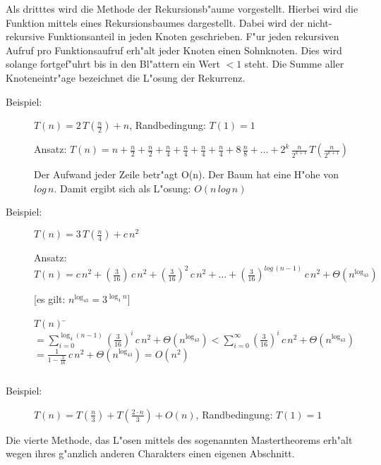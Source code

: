 \documentclass[draft,12pt]{scrreprt}
\theoremstyle{break}
\begin{document}
Als dritttes wird die Methode der Rekursionsb"aume vorgestellt.
Hierbei wird die Funktion mittels eines Rekursionsbaumes dargestellt. Dabei wird der nicht-rekursive Funktionsanteil in jeden Knoten
geschrieben. F"ur jeden rekursiven Aufruf pro Funktionsaufruf erh"alt jeder Knoten einen Sohnknoten. Dies wird solange fortgef"uhrt bis
in den Bl"attern ein Wert $< 1$ steht. Die Summe aller Knoteneintr"age bezeichnet die L"osung der Rekurrenz.
	\begin{description}
		\item [Beispiel:] $T(n) = 2\, T\left(\frac{n}{2}\right) + n$, Randbedingung: $T(1)=1$
			
		Ansatz: $T(n) = n + \frac{n}{2} + \frac{n}{2} + \frac{n}{4} + \frac{n}{4} + \frac{n}{4} + \frac{n}{4} + 8\, \frac{n}{8} + 
		\ldots + {2^k} \, \frac{n}{2^{k+1}}\, T\left(\frac{n}{2^{k+1}}\right)$
			
		
			
		Der Aufwand jeder Zeile betr"agt O(n). Der Baum hat eine H"ohe von $log\,n$. Damit ergibt sich als L"osung: 
		$O(n\, log\,n)$			
		
		\item [Beispiel:] $T(n) = 3\, T(\frac{n}{4}) + c\, n^2$
						
		Ansatz: $T(n) = c\, n^2 + \left(\frac{3}{16} \right) \, c\, n^2 + \left(\frac{3}{16}\right)^2\, c\, n^2 + \ldots +
		\left(\frac{3}{16}\right)^{log\, \left(n-1\right)}\, c\, n^2 + \Theta\left(n^{\log_43}\right)$
			
		[es gilt: $n^{\log_43}=3^{\log_4n}$]
			\begin{tabbing}
				$T(n)$ \= $= \sum_{i=0}^{\log_4\left(n-1\right)}\left(\frac{3}{16}\right)^i\, c\, n^2+ \Theta\left(n^{\log_43}\right) 
				< \sum_{i=0}^{\infty}\left(\frac{3}{16}\right)^i\, c\, n^2 + \Theta(n^{\log_43})$\\
				\> $= \frac{1}{1-\frac{3}{16}}\, c\, n^2 + \Theta(n^{\log_43})=O(n^2)$
			\end{tabbing}			
		$$  $$
	\end{description}
		
\begin{description}
	\item [Beispiel:] $T(n) = T\left(\frac{n}{3}\right) + T\left(\frac{2\cdot n}{3}\right) + O(n)$, Randbedingung: $T(1)=1$
	$$  $$
	\end{description}		
%
Die vierte Methode, das L"osen mittels des sogenannten Mastertheorems erh"alt wegen ihres g"anzlich anderen Charakters einen eigenen
Abschnitt.
%
\end{document}
